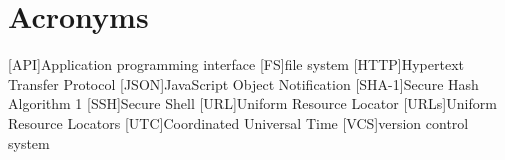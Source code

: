 \chapter*{Acronyms}
\begin{acronym}
    [API]{Application programming interface}
    [FS]{file system}
    [HTTP]{Hypertext Transfer Protocol}
    [JSON]{JavaScript Object Notification}
    [SHA-1]{Secure Hash Algorithm 1}
    [SSH]{Secure Shell}
    [URL]{Uniform Resource Locator}
    [URLs]{Uniform Resource Locators}
    [UTC]{Coordinated Universal Time}
    [VCS]{version control system}
\end{acronym}
